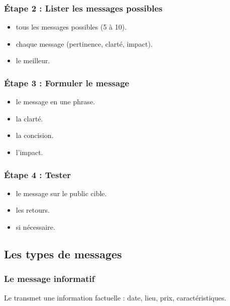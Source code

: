 \subsubsection{Étape 2 : Lister les messages possibles}

\begin{itemize}
    \item {} tous les messages possibles (5 à 10).
    \item {} chaque message (pertinence, clarté, impact).
    \item {} le meilleur.
\end{itemize}

\subsubsection{Étape 3 : Formuler le message}

\begin{itemize}
    \item {} le message en une phrase.
    \item {} la clarté.
    \item {} la concision.
    \item {} l'impact.
\end{itemize}

\subsubsection{Étape 4 : Tester}

\begin{itemize}
    \item {} le message sur le public cible.
    \item {} les retours.
    \item {} si nécessaire.
\end{itemize}

\subsection{Les types de messages}

\subsubsection{Le message informatif}

Le  transmet une information factuelle : date, lieu, prix, caractéristiques.

